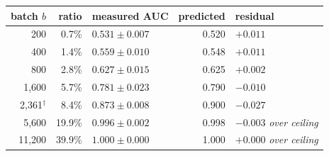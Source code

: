 \begin{tabular}{rrlrl}
\toprule
batch $b$ & ratio & measured AUC & predicted & residual \\
\midrule
200 & 0.7\% & $0.531 \pm 0.007$ & 0.520 & $+0.011$ \\
400 & 1.4\% & $0.559 \pm 0.010$ & 0.548 & $+0.011$ \\
800 & 2.8\% & $0.627 \pm 0.015$ & 0.625 & $+0.002$ \\
1{,}600 & 5.7\% & $0.781 \pm 0.023$ & 0.790 & $-0.010$ \\
2{,}361$^{\dagger}$ & 8.4\% & $0.873 \pm 0.008$ & 0.900 & $-0.027$ \\
5{,}600 & 19.9\% & $0.996 \pm 0.002$ & 0.998 & $-0.003$ \textit{over ceiling} \\
11{,}200 & 39.9\% & $1.000 \pm 0.000$ & 1.000 & $+0.000$ \textit{over ceiling} \\
\bottomrule
\end{tabular}
